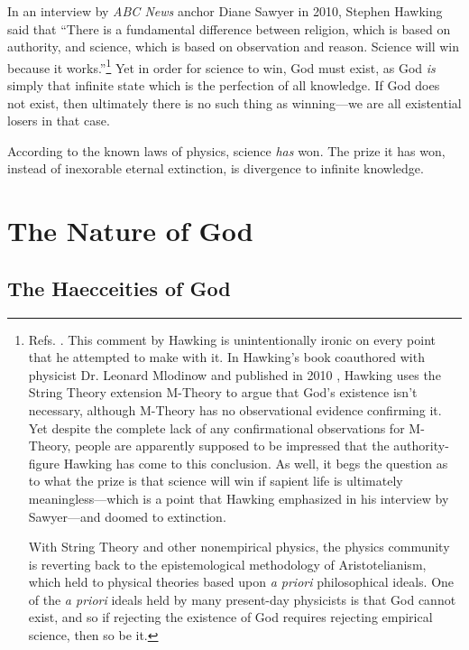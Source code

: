 \documentclass[letterpaper,12pt]{article}
\begin{document}
In an interview by \emph{ABC News} anchor Diane Sawyer in 2010, Stephen Hawking said that ``There is a fundamental difference between religion, which is based on authority, and science, which is based on observation and reason. Science will win because it works.''\footnote{Refs. . This comment by Hawking is unintentionally ironic on every point that he attempted to make with it. In Hawking's book coauthored with physicist Dr. Leonard Mlodinow and published in 2010 \cite{HawkingMlodinow2010}, Hawking uses the String Theory extension M-Theory to argue that God's existence isn't necessary, although M-Theory has no observational evidence confirming it. Yet despite the complete lack of any confirmational observations for M-Theory, people are apparently supposed to be impressed that the authority-figure Hawking has come to this conclusion. As well, it begs the question as to what the prize is that science will win if sapient life is ultimately meaningless---which is a point that Hawking emphasized in his interview by Sawyer---and doomed to extinction.\par
     With String Theory and other nonempirical physics, the physics community is reverting back to the epistemological methodology of Aristotelianism, which held to physical theories based upon \emph{a priori} philosophical ideals. One of the \emph{a priori} ideals held by many present-day physicists is that God cannot exist, and so if rejecting the existence of God requires rejecting empirical science, then so be it.} Yet in order for science to win, God must exist, as God \emph{is} simply that infinite state which is the perfection of all knowledge. If God does not exist, then ultimately there is no such thing as winning---we are all existential losers in that case.

According to the known laws of physics, science \emph{has} won. The prize it has won, instead of inexorable eternal extinction, is divergence to infinite knowledge.

\section{The Nature of God}
\label{sec:NatureOfGod}

\subsection{The Haecceities of God}
\label{subsec:HaecceitiesOfGod}
\end{document}
